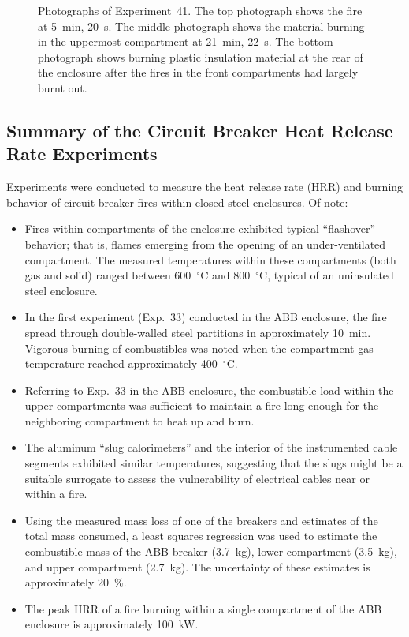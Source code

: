 \begin{figure}[p]
\caption[Photographs of Experiment~41]{Photographs of Experiment~41. The top photograph shows the fire at 5~min, 20~s. The middle photograph shows the material burning in the uppermost compartment at 21~min, 22~s. The bottom photograph shows burning plastic insulation material at the rear of the enclosure after the fires in the front compartments had largely burnt out. }
\label{fig:Test_41_photos}
\end{figure}


\clearpage

\subsection{Summary of the Circuit Breaker Heat Release Rate Experiments}

Experiments were conducted to measure the heat release rate (HRR) and burning behavior of circuit breaker fires within closed steel enclosures. Of note:
\begin{itemize}
\item Fires within compartments of the enclosure exhibited typical ``flashover'' behavior; that is, flames emerging from the opening of an under-ventilated compartment. The measured temperatures within these compartments (both gas and solid) ranged between 600~$^\circ$C and 800~$^\circ$C, typical of an uninsulated steel enclosure.
\item In the first experiment (Exp.~33) conducted in the ABB enclosure, the fire spread through double-walled steel partitions in approximately 10~min. Vigorous burning of combustibles was noted when the compartment gas temperature reached approximately 400~$^\circ$C.
\item Referring to Exp.~33 in the ABB enclosure, the combustible load within the upper compartments was sufficient to maintain a fire long enough for the neighboring compartment to heat up and burn.
\item The aluminum ``slug calorimeters'' and the interior of the instrumented cable segments exhibited similar temperatures, suggesting that the slugs might be a suitable surrogate to assess the vulnerability of electrical cables near or within a fire.
\item Using the measured mass loss of one of the breakers and estimates of the total mass consumed, a least squares regression was used to estimate the combustible mass of the ABB breaker (3.7~kg), lower compartment (3.5~kg), and upper compartment (2.7~kg). The uncertainty of these estimates is approximately 20~\%.
\item The peak HRR of a fire burning within a single compartment of the ABB enclosure is approximately 100~kW.
\end{itemize}





